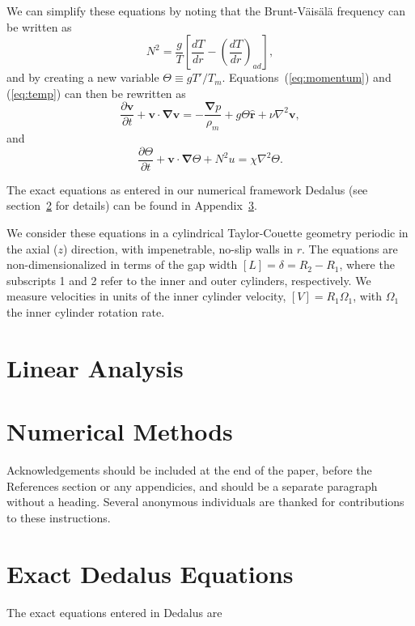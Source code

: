 \documentclass{jfm}
\begin{document}
We can simplify these equations by noting that the Brunt-V\"ais\"al\"a frequency can be written as
\begin{equation}
  \label{eq:brunt}
  N^2 = \frac{g}{T}\left[\frac{d T}{dr} - \left(\frac{d T}{dr}\right)_{ad}\right],
\end{equation}
and by creating a new variable $\Theta \equiv g T'/T_m$. Equations~(\ref{eq:momentum}) and (\ref{eq:temp}) can then be rewritten as 
\begin{equation}
  \label{eq:final_momentum}
  \frac{\partial \mathbf{v}}{\partial t} + \mathbf{v \cdot \nabla v} = -\frac{\mathbf{\nabla} p}{\rho_m} + g \Theta \mathbf{\hat{r}} + \nu \nabla^2 \mathbf{v},
\end{equation}
and
\begin{equation}
  \label{eq:final_temp}
  \frac{\partial \Theta}{\partial t} + \mathbf{v \cdot \nabla} \Theta + N^2 u = \chi \nabla^2 \Theta.
\end{equation}

The exact equations as entered in our numerical framework Dedalus (see
section~\ref{sec:numerical} for details) can be found in
Appendix~\ref{sec:appendix_dedalus}.

We consider these equations in a cylindrical Taylor-Couette geometry
periodic in the axial ($z$) direction, with impenetrable, no-slip
walls in $r$. The equations are non-dimensionalized in terms of the
gap width $[L] = \delta = R_2 -R_1$, where the subscripts 1 and 2
refer to the inner and outer cylinders, respectively. We measure
velocities in units of the inner cylinder velocity,
$[V] = R_1 \Omega_1$, with $\Omega_1$ the inner cylinder rotation
rate. 

\section{Linear Analysis}
\label{sec:linear}

\section{Numerical Methods}
\label{sec:numerical}


Acknowledgements should be included at the end of the paper, before
the References section or any appendicies, and should be a separate
paragraph without a heading. Several anonymous individuals are thanked
for contributions to these instructions.

\appendix
\section{Exact Dedalus Equations}
\label{sec:appendix_dedalus}
The exact equations entered in Dedalus are 



\end{document}
